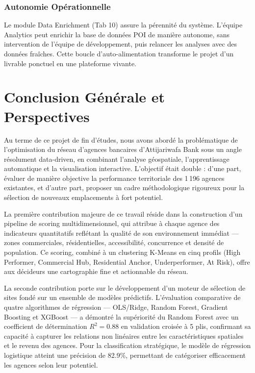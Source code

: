 \documentclass[11pt,a4paper,twoside]{report}
\begin{document}
\subsection{Autonomie Opérationnelle}

Le module Data Enrichment (Tab 10) assure la pérennité du système. L'équipe Analytics peut enrichir la base de données POI de manière autonome, sans intervention de l'équipe de développement, puis relancer les analyses avec des données fraîches. Cette boucle d'auto-alimentation transforme le projet d'un livrable ponctuel en une plateforme vivante.

\chapter*{Conclusion Générale et Perspectives}

Au terme de ce projet de fin d'études, nous avons abordé la problématique de l'optimisation du réseau d'agences bancaires d'Attijariwafa Bank sous un angle résolument data-driven, en combinant l'analyse géospatiale, l'apprentissage automatique et la visualisation interactive. L'objectif était double : d'une part, évaluer de manière objective la performance territoriale des 1\,196 agences existantes, et d'autre part, proposer un cadre méthodologique rigoureux pour la sélection de nouveaux emplacements à fort potentiel.

La première contribution majeure de ce travail réside dans la construction d'un pipeline de scoring multidimensionnel, qui attribue à chaque agence des indicateurs quantitatifs reflétant la qualité de son environnement immédiat --- zones commerciales, résidentielles, accessibilité, concurrence et densité de population. Ce scoring, combiné à un clustering K-Means en cinq profils (High Performer, Commercial Hub, Residential Anchor, Underperformer, At Risk), offre aux décideurs une cartographie fine et actionnable du réseau.

La seconde contribution porte sur le développement d'un moteur de sélection de sites fondé sur un ensemble de modèles prédictifs. L'évaluation comparative de quatre algorithmes de régression --- OLS/Ridge, Random Forest, Gradient Boosting et XGBoost --- a démontré la supériorité du Random Forest avec un coefficient de détermination $R^2 = 0.88$ en validation croisée à 5 plis, confirmant sa capacité à capturer les relations non linéaires entre les caractéristiques spatiales et le revenu des agences. Pour la classification stratégique, le modèle de régression logistique atteint une précision de 82.9\%, permettant de catégoriser efficacement les agences selon leur potentiel.
\end{document}
